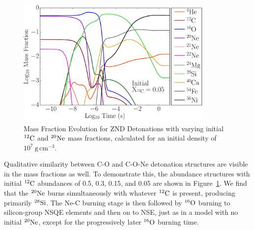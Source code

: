 \documentclass[iop,apj]{emulateapj}
\newcommand{\figref}[1]{Figure~\ref{#1}}
\newcommand{\C}[1]{\ensuremath{{}^{#1}{\rm C}}}
\newcommand{\Ox}[1]{\ensuremath{{}^{#1}{\rm O}}}
\newcommand{\Ne}[1]{\ensuremath{{}^{#1}{\rm Ne}}}
\newcommand{\Si}[1]{\ensuremath{{}^{#1}{\rm Si}}}
\newcommand{\unitspace}{\ensuremath{\,}}
\newcommand{\usp}{\unitspace}
\newcommand{\unitstyle}[1]{\ensuremath{\mathrm{#1}}}
\newcommand{\power}[2]{\ensuremath{{#1}^{#2}}}
\newcommand{\centi}{\unitstyle{c}}
\newcommand{\meter}{\unitstyle{m}}
\newcommand{\cm}{\centi\meter}
\newcommand{\gram}{\unitstyle{g}}
\newcommand{\grampercc}{\gram\usp\power{\cm}{-3}} %
\begin{document}
\begin{figure}[t]
\begin{minipage}{0.5\textwidth}
	\end{minipage}
	\hfill
	\begin{minipage}{0.5\textwidth}
		\includegraphics[width=0.86\textwidth]{figures/detonation_plotfiles/XvsT_wn_45_XC-05.pdf}
	\end{minipage}
        \caption{\label{fig:znd_abundances} Mass Fraction Evolution for ZND Detonations with varying initial \C{12} and \Ne{20} mass fractions, calculated for an initial density of $10^7~\grampercc$.}

\end{figure}

Qualitative similarity between C-O and C-O-Ne detonation structures
are visible in the mass fractions as well.
To demonstrate this, the abundance structures with initial \C{12} abundances of 0.5, 0.3,
0.15, and 0.05 are shown in \figref{fig:znd_abundances}. 
We find that the \Ne{20} burns simultaneously with whatever \C{12} is present,
producing primarily \Si{28}.  The Ne-C burning stage is then followed by \Ox{16}
burning to silicon-group NSQE elements and then on to NSE,
just as in a model with no initial \Ne{20}, except for the progressively
later \Ox{16} burning time.
\end{document}
